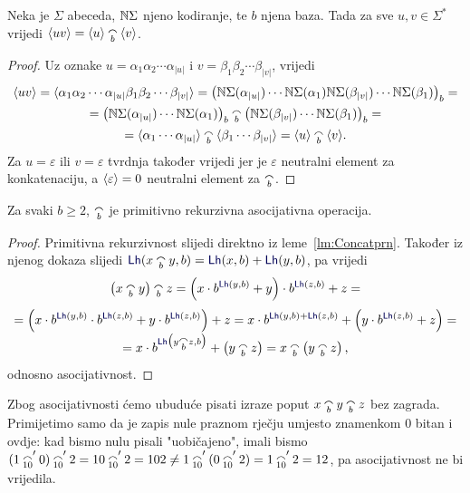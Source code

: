 \begin{propozicija}\label{pp:krkonkkr}
Neka je $\Sigma$ abeceda, ${\mathbb N}\Sigma$ njeno kodiranje, te $b$ njena baza. Tada za sve $u,v\in\Sigma^*$ vrijedi
    $\kr{uv}=\kr u\conc b\kr v$.
\end{propozicija}
\begin{proof}
Uz oznake $u=\alpha_1\alpha_2\dotsm\alpha_{\left|u\right|}$ i $v=\beta_1\beta_2\dotsm\beta_{\left|v\right|}$, vrijedi
\begin{multline}
\kr{uv}=\kr{\alpha_1\alpha_2\dotsm\alpha_{\left|u\right|}\beta_1\beta_2\dotsm\beta_{\left|v\right|}}=\bigl(
\N\Sigma(\alpha_{\left|u\right|})
\dotsm
\N\Sigma(\alpha_1)
\N\Sigma(\beta_{\left|v\right|})
\dotsm
\N\Sigma(\beta_1)
\bigr)_b=\\
=\bigl(
\N\Sigma(\alpha_{\left|u\right|})
\dotsm
\N\Sigma(\alpha_1)
\bigr)_b\conc b\bigl(
\N\Sigma(\beta_{\left|v\right|})
\dotsm
\N\Sigma(\beta_1)
\bigr)_b=\\
=\kr{\alpha_1\dotsm\alpha_{\left|u\right|}}\conc b\kr{\beta_1\dotsm\beta_{\left|v\right|}}=\kr u\conc b\kr v\text.
\end{multline}
Za $u=\varepsilon$ ili $v=\varepsilon$ tvrdnja također vrijedi jer je $\varepsilon$ neutralni element za konkatenaciju, a $\langle\varepsilon\rangle=0$ neutralni element za $\conc b$.
\end{proof}

\begin{propozicija}\label{pp:concprn}
Za svaki $b\ge 2$, $\conc b$ je primitivno rekurzivna asocijativna operacija.
\end{propozicija}
\begin{proof}
Primitivna rekurzivnost slijedi direktno iz leme~\ref{lm:Concatprn}. Također iz njenog dokaza slijedi $\f{Lh}(x\conc b y,b)=\f{Lh}(x,b)+\f{Lh}(y,b)$, pa vrijedi
\begin{multline}
    \left(x\conc b y\right)\conc b z=\left(x\cdot b^{\f{Lh}(y,b)}+y\right)\cdot b^{\f{Lh}(z,b)}+z=\\[1mm]
    =\left(x\cdot b^{\f{Lh}(y,b)}\cdot b^{\f{Lh}(z,b)}+y\cdot b^{\f{Lh}(z,b)}\right)+z=
    x\cdot b^{\f{Lh}(y,b)+\f{Lh}(z,b)}+\left(y\cdot b^{\f{Lh}(z,b)}+z\right)=\\[-1mm]
    =x\cdot b^{\f{Lh}\bigl(y\conc b z,b\bigr)}+\left(y\conc b z\right)=x\conc b\left(y\conc b z\right)\text,
\end{multline}
odnosno asocijativnost.
\end{proof}
Zbog asocijativnosti ćemo ubuduće pisati izraze poput $x\conc by\conc bz$ bez zagrada. Primijetimo samo da je zapis nule praznom rječju umjesto znamenkom $0$ bitan i ovdje: kad bismo nulu pisali "uobičajeno", imali bismo $(1\conc{10}'0)\conc{10}'2=10\conc{10}'2=102\not=1\conc{10}'(0\conc{10}'2)=1\conc{10}'2=12$, pa asocijativnost ne bi vrijedila.

